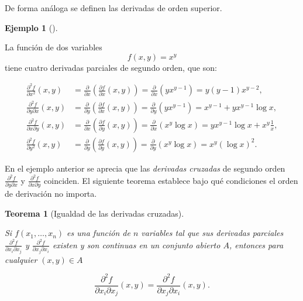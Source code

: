 \documentclass[
  a4paper,
]{scrreport}
\theoremstyle{definition}
\theoremstyle{plain}
\newtheorem{theorem}{Teorema}[chapter]
\theoremstyle{plain}
\theoremstyle{definition}
\theoremstyle{definition}
\newtheorem{example}{Ejemplo}[chapter]
\theoremstyle{plain}
\theoremstyle{remark}
\begin{document}
De forma análoga se definen las derivadas de orden superior.

\begin{example}[]\protect\hypertarget{exm-derivadas-segundo-orden}{}\label{exm-derivadas-segundo-orden}

La función de dos variables \[f(x,y)=x^y\] tiene cuatro derivadas
parciales de segundo orden, que son:

\[\begin{aligned}
\frac{\partial^2 f}{\partial x^2}(x,y) &=
\frac{\partial}{\partial x}\left(\frac{\partial f}{\partial x}(x,y)\right) =
\frac{\partial}{\partial x}\left(yx^{y-1}\right) =
y(y-1)x^{y-2},\\
\frac{\partial^2 f}{\partial y \partial x}(x,y) &=
\frac{\partial}{\partial y}\left(\frac{\partial f}{\partial x}(x,y)\right) =
\frac{\partial}{\partial y}\left(yx^{y-1}\right) =
x^{y-1}+yx^{y-1}\log x,\\
\frac{\partial^2 f}{\partial x \partial y}(x,y) &=
\frac{\partial}{\partial x}\left(\frac{\partial f}{\partial y}(x,y)\right) =
\frac{\partial}{\partial x}\left(x^y\log x \right) =
yx^{y-1}\log x+x^y\frac{1}{x},\\
\frac{\partial^2 f}{\partial y^2}(x,y) &=
\frac{\partial}{\partial y}\left(\frac{\partial f}{\partial y}(x,y)\right) =
\frac{\partial}{\partial y}\left(x^y\log x \right) =
x^y(\log x)^2.\end{aligned}\]

\end{example}

En el ejemplo anterior se aprecia que las \emph{derivadas cruzadas} de
segundo orden \(\frac{\partial^2 f}{\partial y\partial x}\) y
\(\frac{\partial^2 f}{\partial x\partial y}\) coinciden. El siguiente
teorema establece bajo qué condiciones el orden de derivación no
importa.

\begin{theorem}[Igualdad de las derivadas
cruzadas]\protect\hypertarget{thm-igualdad-derivadas-cruzadas}{}\label{thm-igualdad-derivadas-cruzadas}

Si \(f(x_1,\ldots,x_n)\) es una función de \(n\) variables tal que sus
derivadas parciales \(\frac{\partial^2 f}{\partial x_i\partial x_j}\) y
\(\frac{\partial^2 f}{\partial x_j\partial x_i}\) existen y son
continuas en un conjunto abierto \(A\), entonces para cualquier
\((x,y)\in A\)

\[
\frac{\partial^2 f}{\partial x_i\partial x_j}(x,y) 
= \frac{\partial^2 f}{\partial x_j\partial x_i}(x,y).
\]

\end{theorem}
\end{document}
